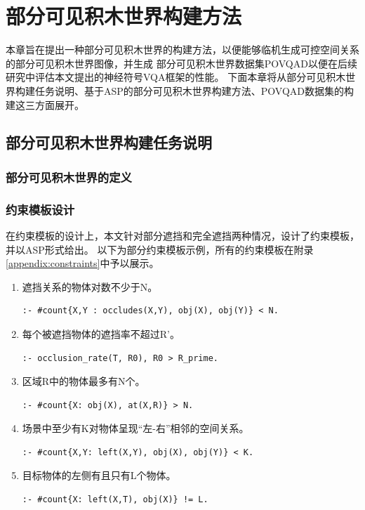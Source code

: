 \chapter{部分可见积木世界构建方法}
\label{dataset}
本章旨在提出一种部分可见积木世界的构建方法，以便能够临机生成可控空间关系的部分可见积木世界图像，并生成
部分可见积木世界数据集POVQAD以便在后续研究中评估本文提出的神经符号VQA框架的性能。
下面本章将从部分可见积木世界构建任务说明、基于ASP的部分可见积木世界构建方法、POVQAD数据集的构建这三方面展开。
\section{部分可见积木世界构建任务说明}

\subsection{部分可见积木世界的定义}

\subsection{约束模板设计}
在约束模板的设计上，本文针对部分遮挡和完全遮挡两种情况，设计了约束模板，并以ASP形式给出。
以下为部分约束模板示例，所有的约束模板在附录\ref{appendix:constraints}中予以展示。
\begin{enumerate}[nosep]
\item 遮挡关系的物体对数不少于N。
\begin{lstlisting}
:- #count{X,Y : occludes(X,Y), obj(X), obj(Y)} < N.
\end{lstlisting}
\item 每个被遮挡物体的遮挡率不超过R'。
\begin{lstlisting}
:- occlusion_rate(T, R0), R0 > R_prime.
\end{lstlisting}
\item 区域R中的物体最多有N个。
\begin{lstlisting}
:- #count{X: obj(X), at(X,R)} > N.
\end{lstlisting}
\item 场景中至少有K对物体呈现“左-右”相邻的空间关系。
\begin{lstlisting}
:- #count{X,Y: left(X,Y), obj(X), obj(Y)} < K.
\end{lstlisting}
\item 目标物体的左侧有且只有L个物体。
\begin{lstlisting}
:- #count{X: left(X,T), obj(X)} != L.
\end{lstlisting}
\end{enumerate}

